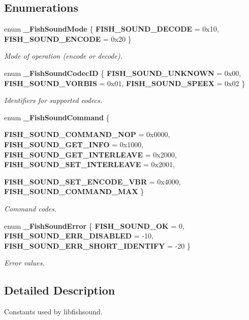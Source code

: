 \subsection*{Enumerations}
\begin{CompactItemize}
\item 
enum {\bf \_\-Fish\-Sound\-Mode} \{ {\bf FISH\_\-SOUND\_\-DECODE} =  0x10, 
{\bf FISH\_\-SOUND\_\-ENCODE} =  0x20
 \}
\begin{CompactList}\small\item\em Mode of operation (encode or decode). \item\end{CompactList}\item 
enum {\bf \_\-Fish\-Sound\-Codec\-ID} \{ {\bf FISH\_\-SOUND\_\-UNKNOWN} =  0x00, 
{\bf FISH\_\-SOUND\_\-VORBIS} =  0x01, 
{\bf FISH\_\-SOUND\_\-SPEEX} =  0x02
 \}
\begin{CompactList}\small\item\em Identifiers for supported codecs. \item\end{CompactList}\item 
enum {\bf \_\-Fish\-Sound\-Command} \{ \par
{\bf FISH\_\-SOUND\_\-COMMAND\_\-NOP} =  0x0000, 
{\bf FISH\_\-SOUND\_\-GET\_\-INFO} =  0x1000, 
{\bf FISH\_\-SOUND\_\-GET\_\-INTERLEAVE} =  0x2000, 
{\bf FISH\_\-SOUND\_\-SET\_\-INTERLEAVE} =  0x2001, 
\par
{\bf FISH\_\-SOUND\_\-SET\_\-ENCODE\_\-VBR} =  0x4000, 
{\bf FISH\_\-SOUND\_\-COMMAND\_\-MAX}
 \}
\begin{CompactList}\small\item\em Command codes. \item\end{CompactList}\item 
enum {\bf \_\-Fish\-Sound\-Error} \{ {\bf FISH\_\-SOUND\_\-OK} =  0, 
{\bf FISH\_\-SOUND\_\-ERR\_\-DISABLED} =  -10, 
{\bf FISH\_\-SOUND\_\-ERR\_\-SHORT\_\-IDENTIFY} =  -20
 \}
\begin{CompactList}\small\item\em Error values. \item\end{CompactList}\end{CompactItemize}


\subsection{Detailed Description}
Constants used by libfishsound. 



